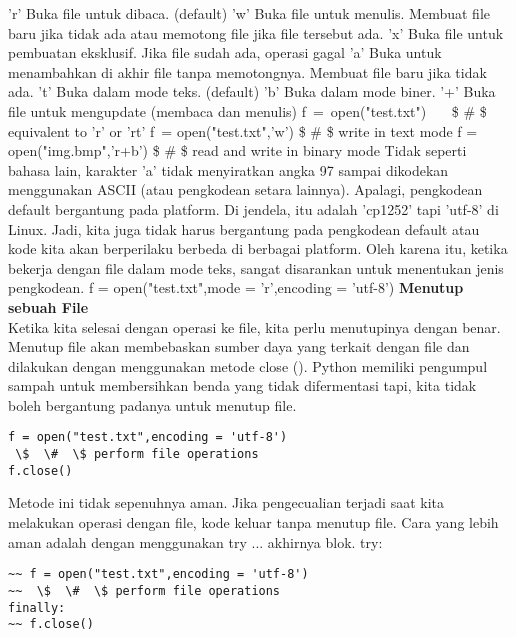 'r' \hspace*{0.5in}  
Buka file untuk dibaca. (default)
'w' \hspace*{0.5in}  
Buka file untuk menulis. Membuat file baru jika tidak ada atau memotong file jika file tersebut ada.  
'x' \hspace*{0.5in}   
Buka file untuk pembuatan eksklusif. Jika file sudah ada, operasi gagal 
'a' \hspace*{0.5in}   
Buka untuk menambahkan di akhir file tanpa memotongnya. Membuat file baru jika tidak ada. 
't' \hspace*{0.5in}   
Buka dalam mode teks. (default)  
'b' 
Buka dalam mode biner.  
'+'  
Buka file untuk mengupdate (membaca dan menulis)  
f~=~open("test.txt")~~~    \$  \#  \$ equivalent to 'r' or 'rt'  
f~= open("test.txt",'w')   \$  \#  \$ write in text mode  
f = open("img.bmp",'r+b')  \$  \#  \$ read and write in binary mode  
Tidak seperti bahasa lain, karakter 'a' tidak menyiratkan angka 97 sampai dikodekan menggunakan ASCII (atau pengkodean setara lainnya). Apalagi, pengkodean default bergantung pada platform. Di jendela, itu adalah 'cp1252' tapi 'utf-8' di Linux. Jadi, kita juga tidak harus bergantung pada pengkodean default atau kode kita akan berperilaku berbeda di berbagai platform. Oleh karena itu, ketika bekerja dengan file dalam mode teks, sangat disarankan untuk menentukan jenis pengkodean.  
f = open("test.txt",mode = 'r',encoding = 'utf-8')  
{\fontsize{14pt}{14pt}\selectfont \textbf{Menutup sebuah File} \\} 
Ketika kita selesai dengan operasi ke file, kita perlu menutupinya dengan benar. Menutup file akan membebaskan sumber daya yang terkait dengan file dan dilakukan dengan menggunakan metode close (). Python memiliki pengumpul sampah untuk membersihkan benda yang tidak difermentasi tapi, kita tidak boleh bergantung padanya untuk menutup file. 

\begin{verbatim}
f = open("test.txt",encoding = 'utf-8')  
 \$  \#  \$ perform file operations 
f.close() 
\end{verbatim}

Metode ini tidak sepenuhnya aman. Jika pengecualian terjadi saat kita melakukan operasi dengan file, kode keluar tanpa menutup file. Cara yang lebih aman adalah dengan menggunakan try ... akhirnya blok.
try:  
\begin{verbatim}
~~ f = open("test.txt",encoding = 'utf-8')  
~~  \$  \#  \$ perform file operations 
finally: 
~~ f.close() 
\end{verbatim}

